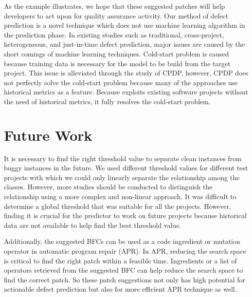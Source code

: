 As the example illustrates, we hope that these suggested patches will help developers to act upon for quality assurance activity.
Our method of defect prediction is a novel technique which does not use machine learning algorithm in the prediction phase.
In existing studies such as traditional, cross-project, heterogeneous, and just-in-time defect prediction, major issues are caused by the short comings of machine learning techniques.
Cold-start problem is caused because training data is necessary for the model to be build from the target project.
This issue is alleviated through the study of CPDP, however, CPDP does not perfectly solve the cold-start problem because many of the approaches use historical metrics as a feature. 
Because {\simfinmo} exploits existing software projects without the need of historical metrics, it fully resolves the cold-start problem.


\section{Future Work}
It is necessary to find the right threshold value to separate clean instances from buggy instances in the future.
We used different threshold values for different test projects with which we could only linearly separate the relationship among the classes.
However, more studies should be conducted to distinguish the relationship using a more complex and non-linear approach.
It was difficult to determine a global threshold that was suitable for all the projects.
However, finding it is crucial for the predictor to work on future projects because historical data are not available to help find the best threshold value.

Additionally, the suggested BFCs can be used as a code ingredient or mutation operator in automatic program repair (APR).
In APR, reducing the search space is critical to find the right patch within a feasible time. Ingredients or a list of operators retrieved from the suggested BFC can help reduce the search space to find the correct patch.
So these patch suggestions not only has high potential for actionable defect prediction but also for more efficient APR technique as well.

